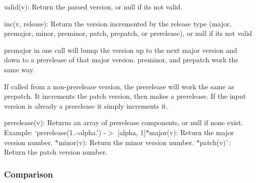 \begin{DoxyItemize}
\item {\ttfamily valid(v)}\+: Return the parsed version, or null if it\textquotesingle{}s not valid.
\item {\ttfamily inc(v, release)}\+: Return the version incremented by the release type ({\ttfamily major}, {\ttfamily premajor}, {\ttfamily minor}, {\ttfamily preminor}, {\ttfamily patch}, {\ttfamily prepatch}, or {\ttfamily prerelease}), or null if it\textquotesingle{}s not valid
\begin{DoxyItemize}
\item {\ttfamily premajor} in one call will bump the version up to the next major version and down to a prerelease of that major version. {\ttfamily preminor}, and {\ttfamily prepatch} work the same way.
\item If called from a non-\/prerelease version, the {\ttfamily prerelease} will work the same as {\ttfamily prepatch}. It increments the patch version, then makes a prerelease. If the input version is already a prerelease it simply increments it.
\end{DoxyItemize}
\item {\ttfamily prerelease(v)}\+: Returns an array of prerelease components, or null if none exist. Example\+: `prerelease(\textquotesingle{}1..-\/alpha.') -\/$>$ \mbox{[}\textquotesingle{}alpha\textquotesingle{}, 1\mbox{]}{\ttfamily  $\ast$}major(v){\ttfamily \+: Return the major version number. $\ast$}minor(v){\ttfamily \+: Return the minor version number. $\ast$}patch(v)\`{}\+: Return the patch version number.
\end{DoxyItemize}

\subsubsection*{Comparison}


